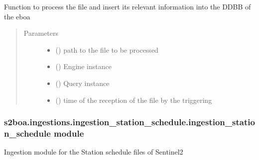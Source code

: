 \begin{fulllineitems}
\label{\detokenize{s2boa.ingestions:s2boa.ingestions.ingestion_station_acquisition_report.ingestion_station_acquisition_report.process_file}}
Function to process the file and insert its relevant information
into the DDBB of the eboa
\begin{quote}\begin{description}
\item[{Parameters}] \leavevmode\begin{itemize}
\item {} 
 () \textendash{} path to the file to be processed

\item {} 
 () \textendash{} Engine instance

\item {} 
 () \textendash{} Query instance

\item {} 
 () \textendash{} time of the reception of the file by the triggering

\end{itemize}

\end{description}\end{quote}

\end{fulllineitems}



\subsubsection{s2boa.ingestions.ingestion\_station\_schedule.ingestion\_station\_schedule module}
\label{\detokenize{s2boa.ingestions:module-s2boa.ingestions.ingestion_station_schedule.ingestion_station_schedule}}\label{\detokenize{s2boa.ingestions:s2boa-ingestions-ingestion-station-schedule-ingestion-station-schedule-module}}
Ingestion module for the Station schedule files of Sentinel\sphinxhyphen{}2

